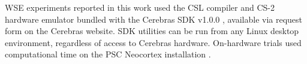 WSE experiments reported in this work used the CSL compiler and CS-2 hardware emulator bundled with the Cerebras SDK v1.0.0 \citep{selig2022cerebras}, available via request form on the Cerebras website.
SDK utilities can be run from any Linux desktop environment, regardless of access to Cerebras hardware.
On-hardware trials used computational time on the PSC Neocortex installation \citep{buitrago2021neocortex}.


